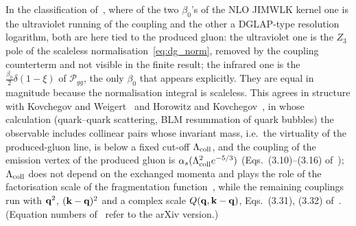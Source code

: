 In the classification of~\cite{Kovner:2023vsy}, where of the two $\beta_0$'s of the NLO JIMWLK kernel one is the ultraviolet running of the coupling and the other a DGLAP-type resolution logarithm, both are here tied to the produced gluon: the ultraviolet one is the $Z_3$ pole of the scaleless normalisation~\eqref{eq:dg_norm}, removed by the coupling counterterm and not visible in the finite result; the infrared one is the $\frac{\beta_0}{2}\delta(1-\xi)$ of $\mathcal P_{gg}$, the only $\beta_0$ that appears explicitly. They are equal in magnitude because the normalisation integral is scaleless. This agrees in structure with Kovchegov and Weigert~\cite{Kovchegov:2007vf} and Horowitz and Kovchegov~\cite{Horowitz:2010yg}, in whose calculation (quark--quark scattering, BLM resummation of quark bubbles) the observable includes collinear pairs whose invariant mass, i.e.\ the virtuality of the produced-gluon line, is below a fixed cut-off $\Lambda_{\rm coll}$, and the coupling of the emission vertex of the produced gluon is $\alpha_s(\Lambda^2_{\rm coll}e^{-5/3})$ (Eqs.~(3.10)--(3.16) of~\cite{Horowitz:2010yg}); $\Lambda_{\rm coll}$ does not depend on the exchanged momenta and plays the role of the factorisation scale of the fragmentation function~\cite{Kovchegov:2007vf}, while the remaining couplings run with $\mathbf{q}^2$, $(\mathbf{k}-\mathbf{q})^2$ and a complex scale $Q(\mathbf{q},\mathbf{k}-\mathbf{q})$, Eqs.~(3.31), (3.32) of~\cite{Horowitz:2010yg}. (Equation numbers of~\cite{Horowitz:2010yg} refer to the arXiv version.)

